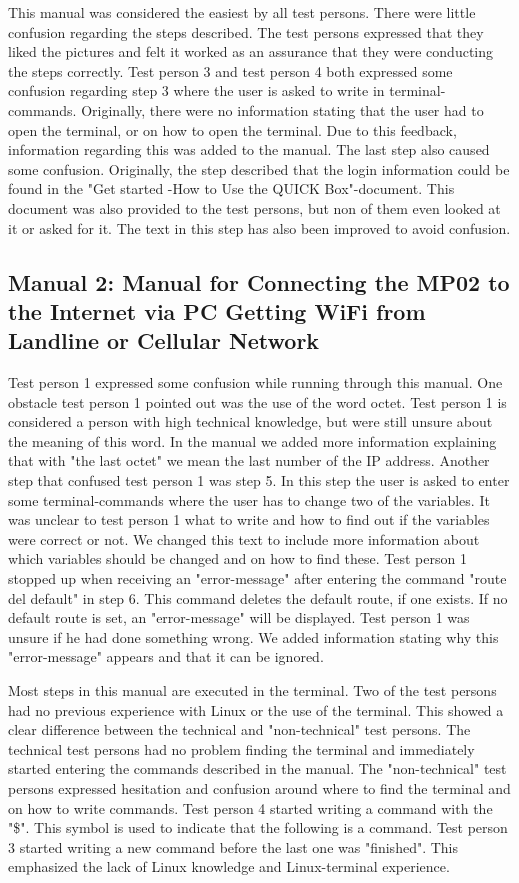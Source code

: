 This manual was considered the easiest by all test persons. There were little confusion regarding the steps described. The test persons expressed that they liked the pictures and felt it worked as an assurance that they were conducting the steps correctly. Test person 3 and test person 4 both expressed some confusion regarding step 3 where the user is asked to write in terminal-commands. Originally, there were no information stating that the user had to open the terminal, or on how to open the terminal. Due to this feedback, information regarding this was added to the manual. The last step also caused some confusion. Originally, the step described that the login information could be found in the "Get started -How to Use the QUICK Box"-document. This document was also provided to the test persons, but non of them even looked at it or asked for it. The text in this step has also been improved to avoid confusion. 

\subsection{Manual 2: Manual for Connecting the MP02 to the Internet via PC Getting WiFi from Landline or Cellular Network}
Test person 1 expressed some confusion while running through this manual. One obstacle test person 1 pointed out was the use of the word octet. Test person 1 is considered a person with high technical knowledge, but were still unsure about the meaning of this word. In the manual we added more information explaining that with "the last octet" we mean the last number of the IP address. Another step that confused test person 1 was step 5. In this step the user is asked to enter some terminal-commands where the user has to change two of the variables. It was unclear to test person 1 what to write and how to find out if the variables were correct or not. We changed this text to include more information about which variables should be changed and on how to find these. Test person 1 stopped up when receiving an "error-message" after entering the command "route del default" in step 6. This command deletes the default route, if one exists. If no default route is set, an "error-message" will be displayed. Test person 1 was unsure if he had done something wrong. We added information stating why this "error-message" appears and that it can be ignored. 

Most steps in this manual are executed in the terminal. Two of the test persons had no previous experience with Linux or the use of the terminal. This showed a clear difference between the technical and "non-technical" test persons. The technical test persons had no problem finding the terminal and immediately started entering the commands described in the manual. The "non-technical" test persons expressed hesitation and confusion around where to find the terminal and on how to write commands. Test person 4 started writing a command with the "\$". This symbol is used to indicate that the following is a command. Test person 3 started writing a new command before the last one was "finished". This emphasized the lack of Linux knowledge and Linux-terminal experience.   

